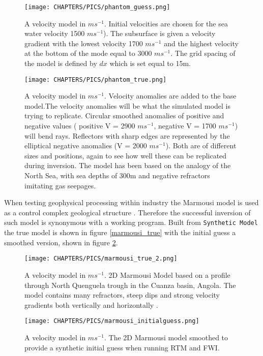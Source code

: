 \begin{figure}[!ht]
  \centering
  \texttt{[image: CHAPTERS/PICS/phantom\_guess.png]}
  \caption[Phantom 2D model, initial starting guess]
{A velocity model in $ms^{-1}$. Initial velocities are chosen for the sea water velocity 1500 $ms^{-1}$). The subsurface is given a velocity gradient with the lowest velocity 1700 $ms^{-1}$ and the highest velocity at the bottom of the mode equal to 3000 $ms^{-1}$. The grid spacing of the model is defined by $dx$ which is set equal to 15m. }
  \label{baseplot}

  \vspace*{\floatsep}

 \texttt{[image: CHAPTERS/PICS/phantom\_true.png]}
 \caption[True phantom 2D model ]
{A velocity model in $ms^{-1}$. Velocity anomalies are added to the base model.The velocity anomalies will be what the simulated model is trying to replicate. Circular smoothed anomalies of positive and negative values ( positive V = 2900 $ms^{-1}$, negative V = 1700 $ms^{-1}$) will bend rays. Reflectors with sharp edges are represented by the elliptical negative anomalies (V = 2000 $ms^{-1}$). Both are of different sizes and positions, again to see how well these can be replicated during inversion. The model has been based on the analogy of the North Sea, with sea depths of 300m and negative refractors imitating gas seepages. }
 \label{testplot}
\end{figure}  

When testing geophysical processing within industry the Marmousi model is used as a control complex geological structure \citep{bourgeois1991marmousi}. Therefore the successful inversion of such model is synonymous with a working program.  Built from \verb|Synthetic Model| the true model is shown in figure \ref{marmousi_true} with the initial guess a smoothed version, shown in figure \ref{marmousi_guess}. 

\begin{figure}[!ht]
  \centering
  \texttt{[image: CHAPTERS/PICS/marmousi\_true\_2.png]}
  \caption[2D Marmousi Model]
{A velocity model in $ms^{-1}$. 2D Marmousi Model based on a profile through North Quenguela trough in the Cuanza basin, Angola. The model contains many refractors, steep dips and strong velocity gradients both vertically and horizontally \citep{bourgeois1991marmousi}.}
  \label{marmousi_true}
  \vspace*{\floatsep}
  \texttt{[image: CHAPTERS/PICS/marmousi\_initialguess.png]}
  \caption[Smoothed 2D Marmousi model]
{A velocity model in $ms^{-1}$. The 2D Marmousi model smoothed to provide a synthetic initial guess when running RTM and FWI.}
 \label{marmousi_guess}
\end{figure}

